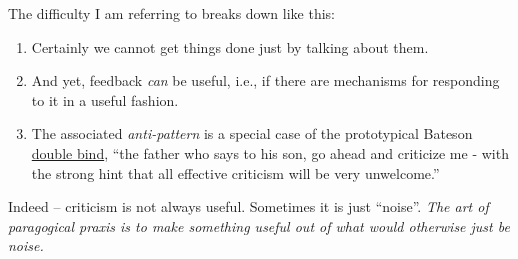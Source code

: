 The difficulty I am referring to breaks down like this:

\begin{enumerate}
\item
  Certainly we cannot get things done just by talking about them.
\item
  And yet, feedback \emph{can} be useful, i.e., if there are mechanisms
  for responding to it in a useful fashion.
\item
  The associated \emph{anti-pattern} is a special case of the
  prototypical Bateson
  \href{http://en.wikipedia.org/wiki/Double\_bind}{double bind}, ``the
  father who says to his son, go ahead and criticize me - with the
  strong hint that all effective criticism will be very unwelcome.''
\end{enumerate}
Indeed -- criticism is not always useful. Sometimes it is just
``noise''. \emph{The art of paragogical praxis is to make something
useful out of what would otherwise just be noise.}
